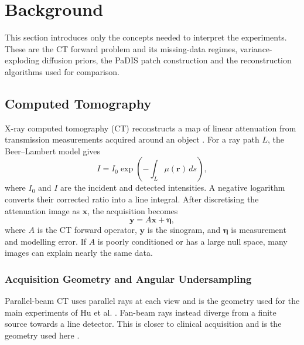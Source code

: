\ifpdf     \graphicspath{{Sections/2_background_figs/Raster/}{Sections/2_background_figs/PDF/}{Sections/2_background_figs/}}
\else     \graphicspath{{Sections/2_background_figs/Vector/}{Sections/2_background_figs/}}
\fi

\chapter{Background}
\label{ch:background}

This section introduces only the concepts needed to interpret the experiments. These are the CT forward problem and its missing-data regimes, variance-exploding diffusion priors, the PaDIS patch construction and the reconstruction algorithms used for comparison.

\section{Computed Tomography}
\label{sec:basics}

X-ray computed tomography (CT) reconstructs a map of linear attenuation from transmission measurements acquired around an object \cite{}. For a ray path \(L\), the Beer--Lambert model gives
\begin{equation}
I=I_0\exp\left(-\int_L \mu(\mathbf{r})\,ds\right),
\label{eq:beer_lambert}
\end{equation}
where \(I_0\) and \(I\) are the incident and detected intensities. A negative logarithm converts their corrected ratio into a line integral. After discretising the attenuation image as \(\mathbf{x}\), the acquisition becomes
\begin{equation}
\mathbf{y}=A\mathbf{x}+\boldsymbol{\eta},
\label{eq:ct_forward_model}
\end{equation}
where \(A\) is the CT forward operator, \(\mathbf{y}\) is the sinogram, and \(\boldsymbol{\eta}\) is measurement and modelling error. If \(A\) is poorly conditioned or has a large null space, many images can explain nearly the same data.

\subsection{Acquisition Geometry and Angular Undersampling}
\label{subsec:ct_geometry_sampling}

Parallel-beam CT uses parallel rays at each view and is the geometry used for the main experiments of Hu et al. \cite{}. Fan-beam rays instead diverge from a finite source towards a line detector. This is closer to clinical acquisition and is the geometry used here \cite{}.


